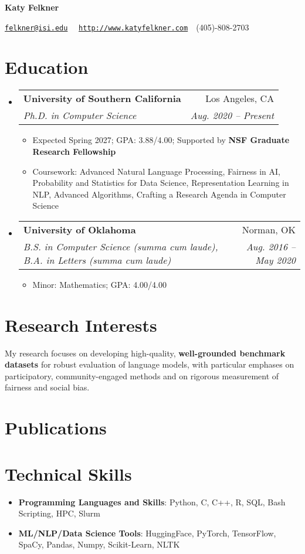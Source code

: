 \documentclass[letterpaper,11pt]{article}
\makeatletter
\newcommand{\resumeItemWithHeader}[2]{
  \item\small{
    \textbf{#1}{: #2 \vspace{-2pt}}
  }
}
\newcommand{\resumeItem}[1]{
  \item\small{
  {#1 \vspace{-2pt}}
  }
}
\newcommand{\resumeSubheading}[4]{
  \vspace{-1pt} \item
    \begin{tabular*}{0.97\textwidth}{l@{\extracolsep{\fill}}r}
      \textbf{#1} & #2 \\
      \textit{\small#3} & \textit{\small #4} \\
      
    \end{tabular*}\vspace{-5pt}
}
\newcommand{\resumeSubHeadingListStart}{\begin{itemize}[label={}, leftmargin=*]}
\newcommand{\resumeSubHeadingListEnd}{\end{itemize}}
\newcommand{\resumeItemListStart}{\begin{itemize}}
\newcommand{\resumeItemListEnd}{\end{itemize}\vspace{-5pt}}
\makeatother
\begin{document}
\textbf{\LARGE Katy Felkner}

\href{mailto:felkner@isi.edu}{\texttt{felkner@isi.edu}}~\textbar~ \href{http://katyfelkner.com/}{\texttt{http://www.katyfelkner.com}}~\textbar~(405)-808-2703


\section{Education}
  \resumeSubHeadingListStart
    \resumeSubheading
      {University of Southern California}{Los Angeles, CA}
      {Ph.D. in Computer Science}{Aug. 2020 -- Present}
      \resumeItemListStart
        \resumeItem{Expected Spring 2027; GPA: 3.88/4.00; Supported by \textbf{NSF Graduate Research Fellowship}}
      \resumeItem{Coursework: Advanced Natural Language Processing, Fairness in AI, Probability and Statistics for Data Science, Representation Learning in NLP, Advanced Algorithms, Crafting a Research Agenda in Computer Science}
      \resumeItemListEnd
      
    \resumeSubheading
      {University of Oklahoma}{Norman, OK}
      {B.S. in Computer Science \textit{(summa cum laude)}, B.A. in Letters \textit{(summa cum laude)}}{Aug. 2016 -- May 2020}
      \resumeItemListStart
        \resumeItem{Minor: Mathematics; GPA: 4.00/4.00} 
      \resumeItemListEnd
  \resumeSubHeadingListEnd

\section{Research Interests}
\small{My research focuses on developing high-quality, \textbf{well-grounded benchmark datasets} for robust evaluation of language models, with particular emphases on participatory, community-engaged methods and on rigorous measurement of fairness and social bias.}

\section{Publications}
\begin{refsection}
\nocite{*}
\printbibliography[heading=none]
\end{refsection}

\section{Technical Skills}
 \resumeSubHeadingListStart
   \resumeItemWithHeader{Programming Languages and Skills}{Python, C, C++, R, SQL, Bash Scripting, HPC, Slurm}
   \resumeItemWithHeader{ML/NLP/Data Science Tools}{HuggingFace, PyTorch, TensorFlow, SpaCy, Pandas, Numpy, Scikit-Learn, NLTK}
 \resumeSubHeadingListEnd
\end{document}
